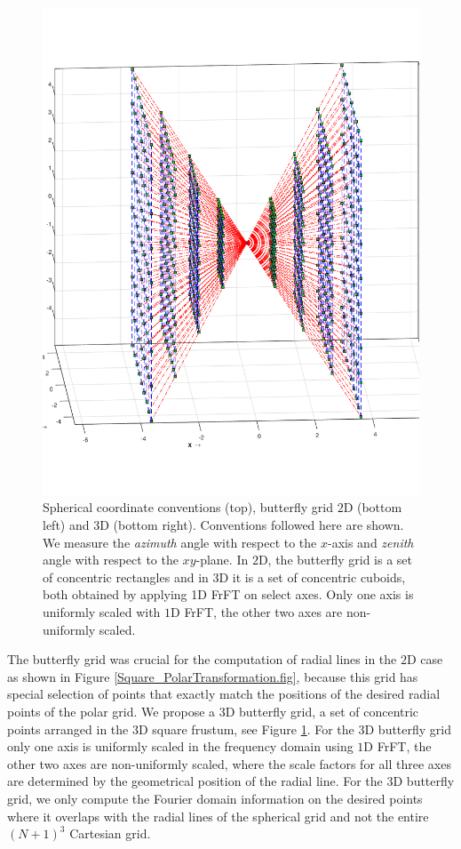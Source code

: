 \documentclass{UCF_ETD}
\begin{document}
\begin{figure}[H]
\begin{center}
 \includegraphics[scale=0.3]{PolarSphericalDFT/ButterflyGrid3D}
 \caption{ Spherical coordinate conventions (top), butterfly grid $2$D (bottom left) and $3$D (bottom right). Conventions followed here are shown. We measure the \emph{azimuth} angle with respect to the $x$-axis and \emph{zenith} angle with respect to the $xy$-plane. In $2$D, the butterfly grid is a set of concentric rectangles and in 3D it is a set of concentric cuboids, both obtained by applying 1D FrFT on select axes. Only one axis is uniformly scaled with $1$D FrFT, the other two axes are non-uniformly scaled.}
 \label{SimpleConventions_ButterflyGrid3D.fig}
 \end{center}
 \end{figure}
 
 The butterfly grid was crucial for the computation of radial lines in the $2$D case as shown in Figure \ref{Square_PolarTransformation.fig}, because this grid has special selection of points that exactly match the positions of the desired radial points of the polar grid. We propose a $3$D butterfly grid, a set of concentric points arranged in the $3$D square frustum, see Figure \ref{SimpleConventions_ButterflyGrid3D.fig}. For the $3$D butterfly grid only one axis is uniformly scaled in the frequency domain using $1$D FrFT, the other two axes are non-uniformly scaled, where the scale factors for all three axes are determined by the geometrical position of the radial line. For the $3$D butterfly grid, we only compute the Fourier domain information on the desired points where it overlaps with the radial lines of the spherical grid  and not the entire $(N+1)^3$ Cartesian grid.
 
\end{document}

